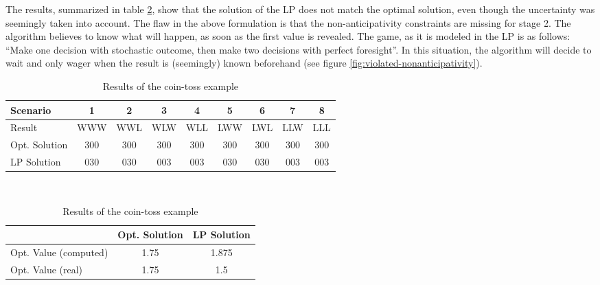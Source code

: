 \begin{example}
  The results, summarized in table \ref{tab:coin-toss-results}, show that the solution of the LP does not match the optimal solution, even though the uncertainty was seemingly taken into account.
  The flaw in the above formulation is that the non-anticipativity constraints are missing for stage 2.
  The algorithm believes to know what will happen, as soon as the first value is revealed.
  The game, as it is modeled in the LP is as follows:
  ``Make one decision with stochastic outcome, then make two decisions with perfect foresight''.
  In this situation, the algorithm will decide to wait and only wager when the result is (seemingly) known beforehand (see figure \ref{fig:violated-nonanticipativity}).
  
  \begin{table}
    \small\centering
    \begin{tabular}{lcccccccc}
      \hline
      Scenario&1&2&3&4&5&6&7&8\\\hline\hline
      Result&WWW&WWL&WLW&WLL&LWW&LWL&LLW&LLL\\
      Opt. Solution&300&300&300&300&300&300&300&300\\
      LP Solution&030&030&003&003&030&030&003&003\\\hline
    \end{tabular}
    \vspace*{0.5cm}\\
    \begin{tabular}{lcc}
      \hline
      &Opt. Solution&LP Solution\\\hline\hline
      Opt. Value (computed)&1.75&1.875\\
      Opt. Value (real)&1.75&1.5\\
      \hline
    \end{tabular}
    \caption{Results of the coin-toss example}
    \label{tab:coin-toss-results}
  \end{table}
\end{example}


